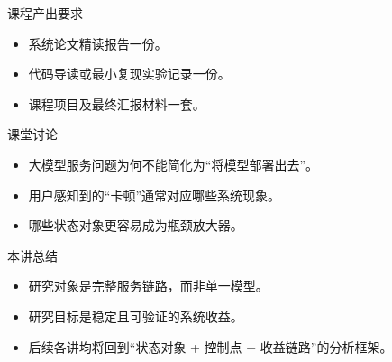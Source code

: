 \begin{frame}{课程产出要求}
  \begin{itemize}
    \item 系统论文精读报告一份。
    \item 代码导读或最小复现实验记录一份。
    \item 课程项目及最终汇报材料一套。
  \end{itemize}
\end{frame}



\begin{frame}{课堂讨论}
  \begin{itemize}
    \item 大模型服务问题为何不能简化为“将模型部署出去”。
    \item 用户感知到的“卡顿”通常对应哪些系统现象。
    \item 哪些状态对象更容易成为瓶颈放大器。
  \end{itemize}
\end{frame}

\begin{frame}{本讲总结}
  \begin{itemize}
    \item 研究对象是完整服务链路，而非单一模型。
    \item 研究目标是稳定且可验证的系统收益。
    \item 后续各讲均将回到“状态对象 + 控制点 + 收益链路”的分析框架。
  \end{itemize}
\end{frame}

